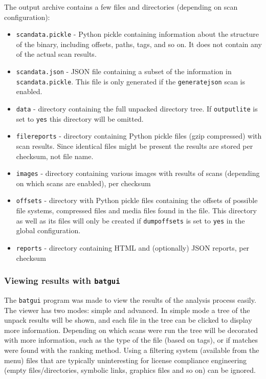 \documentclass[10pt,a4paper]{article}
\begin{document}
The output archive contains a few files and directories (depending on scan
configuration):

\begin{itemize}
\item \texttt{scandata.pickle} - Python pickle containing information about the
structure of the binary, including offsets, paths, tags, and so on. It does not
contain any of the actual scan results.
\item \texttt{scandata.json} - JSON file containing a subset of
the information in \texttt{scandata.pickle}. This file is only generated if the
\texttt{generatejson} scan is enabled.
\item \texttt{data} - directory containing the full unpacked directory tree.
If \texttt{outputlite} is set to \texttt{yes} this directory will be omitted.
\item \texttt{filereports} - directory containing Python pickle files (gzip
compressed) with scan results. Since identical files might be present the
results are stored per checksum, not file name.
\item \texttt{images} - directory containing various images with results of
scans (depending on which scans are enabled), per checksum
\item \texttt{offsets} - directory with Python pickle files containing the
offsets of possible file systems, compressed files and media files found in
the file. This directory as well as its files will only be created if
\texttt{dumpoffsets} is set to \texttt{yes} in the global configuration.
\item \texttt{reports} - directory containing HTML and (optionally) JSON
reports, per checksum
\end{itemize}

\subsubsection{Viewing results with \texttt{batgui}}

The \texttt{batgui} program was made to view the results of the analysis
process easily. The viewer has two modes: simple and advanced. In simple mode
a tree of the unpack results will be shown, and each file in the tree can be
clicked to display more information. Depending on which scans were run the tree
will be decorated with more information, such as the type of the file (based on
tags), or if matches were found with the ranking method. Using a filtering
system (available from the menu) files that are typically uninteresting for
license compliance engineering (empty files/directories, symbolic links,
graphics files and so on) can be ignored.
\end{document}

